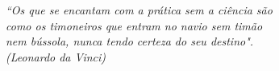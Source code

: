 \begin{epigrafe}
    \vspace*{\fill}
	\begin{flushright}
	
		
		\textit{``Os que se encantam com a prática sem a ciência são \\
		como os timoneiros que entram no navio sem timão\\
		nem bússola, nunca tendo certeza do seu destino". \\
		(Leonardo da Vinci)}
	\end{flushright}
\end{epigrafe}
